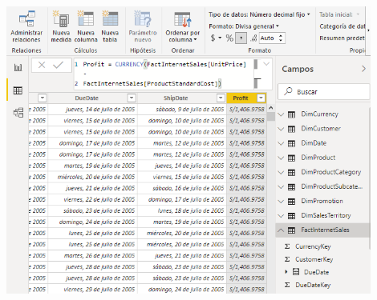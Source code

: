 \documentclass[12pt,letterpaper]{article}
\begin{document}
\begin{itemize}
\begin{center}
\end{center}
\begin{center}
\includegraphics[width=12cm]{./Imagenes/8}
\end{center}

\end{itemize}
\end{document}
